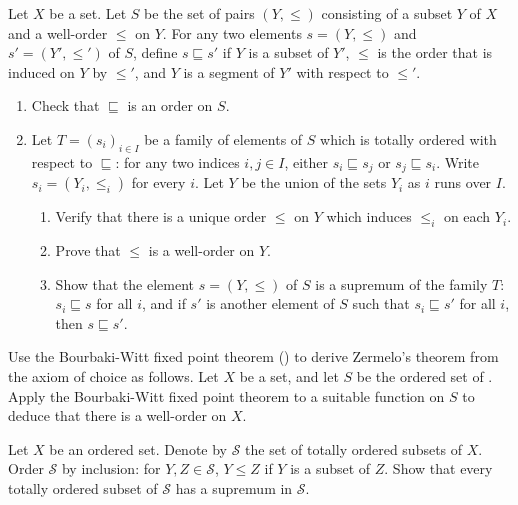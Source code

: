 \documentclass{article}
\begin{document}
\begin{exercise}
  \label{exe:mfln3otu}
  Let \(X\) be a set.  Let \(S\) be the set of pairs \((Y, \leq)\)
  consisting of a subset \(Y\) of \(X\) and a well-order \(\leq\) on
  \(Y\).  For any two elements \(s = (Y, \leq)\) and
  \(s' = (Y', \leq')\) of \(S\), define \(s \sqsubseteq s'\) if \(Y\)
  is a subset of \(Y'\), \(\leq\) is the order that is induced on
  \(Y\) by \(\leq'\), and \(Y\) is a segment of \(Y'\) with respect to
  \(\leq'\).
  \begin{enumerate}
  \item Check that \(\sqsubseteq\) is an order on \(S\).
  \item Let \(T = (s_i)_{i \in I}\) be a family of elements of \(S\)
    which is totally ordered with respect to \(\sqsubseteq\): for any
    two indices \(i, j \in I\), either \(s_i \sqsubseteq s_j\) or
    \(s_j \sqsubseteq s_i\).  Write \(s_i = (Y_i, \leq_i)\) for every
    \(i\).  Let \(Y\) be the union of the sets \(Y_i\) as \(i\) runs
    over \(I\).
    \begin{enumerate}
    \item Verify that there is a unique order \(\leq\) on \(Y\) which
      induces \(\leq_i\) on each \(Y_i\).
    \item Prove that \(\leq\) is a well-order on \(Y\).
    \item Show that the element \(s = (Y, \leq)\) of \(S\) is a
      supremum of the family \(T\): \(s_i \sqsubseteq s\) for all
      \(i\), and if \(s'\) is another element of \(S\) such that
      \(s_i \sqsubseteq s'\) for all \(i\), then \(s \sqsubseteq s'\).
    \end{enumerate}
  \end{enumerate}
\end{exercise}

\begin{exercise}
  \label{exe:fgbbb6v2}
  Use the Bourbaki-Witt fixed point theorem () to
  derive Zermelo's theorem from the axiom of choice as follows.  Let
  \(X\) be a set, and let \(S\) be the ordered set of
  .  Apply the Bourbaki-Witt fixed point theorem to
  a suitable function on \(S\) to deduce that there is a well-order on
  \(X\).
\end{exercise}

\begin{exercise}
  \label{exe:64qxlchj}
  Let \(X\) be an ordered set.  Denote by \(\mathcal{S}\) the set of
  totally ordered subsets of \(X\).  Order \(\mathcal{S}\) by
  inclusion: for \(Y, Z \in \mathcal{S}\), \(Y \leq Z\) if \(Y\) is a
  subset of \(Z\).  Show that every totally ordered subset of
  \(\mathcal{S}\) has a supremum in \(\mathcal{S}\).
\end{exercise}
\end{document}
